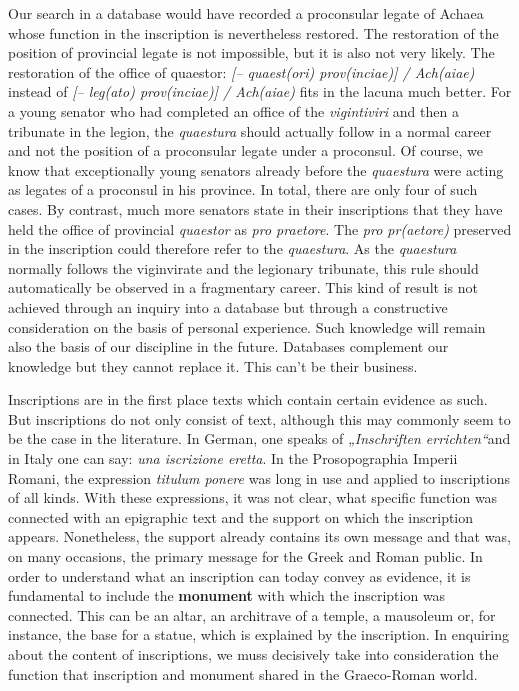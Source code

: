\documentclass{article}
\begin{document}
Our search in a database would have recorded a proconsular legate of Achaea whose 
function in the inscription is nevertheless restored. The restoration of the position 
of provincial legate is not impossible, but it is also not very likely. The restoration 
of the office of quaestor:\textit{ [-- quaest(ori) prov(inciae)] / Ach(aiae) }instead 
of \textit{[-- leg(ato) prov(inciae)] / Ach(aiae) }fits in the lacuna much better. 
For a young senator who had completed an office of the \textit{vigintiviri }and 
then a tribunate in the legion, the \textit{quaestura }should actually follow in 
a normal career and not the position of a proconsular legate under a proconsul. 
Of course, we know that exceptionally young senators already before the \textit{quaestura 
}were acting as legates of a proconsul in his province. In total, there are only 
four of such cases. By contrast, much more senators state in their inscriptions 
that they have held the office of provincial \textit{quaestor} as\textit{ pro praetore}. 
The \textit{pro pr(aetore) }preserved in the inscription could therefore refer 
to the \textit{quaestura}. As the \textit{quaestura }normally follows the\textit{ 
}viginvirate and the legionary tribunate, this rule should automatically be observed 
in a fragmentary career. This kind of result is not achieved through an inquiry 
into a database but through a constructive consideration on the basis of personal 
experience. Such knowledge will remain also the basis of our discipline in the 
future. Databases complement our knowledge but they cannot replace it. This can't 
be their business. 

Inscriptions are in the first place texts which contain certain evidence as such. 
But inscriptions do not only consist of text, although this may commonly seem to 
be the case in the literature. In German, one speaks of \textit{„Inschriften 
errichten``}and in Italy one can say: \textit{una iscrizione eretta}. In the Prosopographia 
Imperii Romani,\textit{ }the expression \textit{titulum ponere }was long in use 
and applied to inscriptions of all kinds. With these expressions, it was not clear, 
what specific function was connected with an epigraphic text and the support on 
which the inscription appears. Nonetheless, the support already contains its own 
message and that was, on many occasions, the primary message for the Greek and 
Roman public. In order to understand what an inscription can today convey as evidence, 
it is fundamental to include the \textbf{monument }with which the inscription was 
connected. This can be an altar, an architrave of a temple, a mausoleum or, for 
instance, the base for a statue, which is explained by the inscription. In enquiring 
about the content of inscriptions, we muss decisively take into consideration the 
function that inscription and monument shared in the Graeco-Roman world. 
\end{document}
